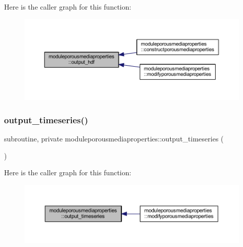 Here is the caller graph for this function\+:\nopagebreak
\begin{figure}[H]
\begin{center}
\leavevmode
\includegraphics[width=350pt]{namespacemoduleporousmediaproperties_afc8549b6ebf2207ac8a080ad892a6cd3_icgraph}
\end{center}
\end{figure}
\mbox{\label{namespacemoduleporousmediaproperties_a23e72e1a1d3d2dc5b268bbc65dbeebed}} 
\subsubsection{\texorpdfstring{output\+\_\+timeseries()}{output\_timeseries()}}
{\footnotesize\ttfamily subroutine, private moduleporousmediaproperties\+::output\+\_\+timeseries (\begin{DoxyParamCaption}{ }\end{DoxyParamCaption})\hspace{0.3cm}{\ttfamily [private]}}

Here is the caller graph for this function\+:\nopagebreak
\begin{figure}[H]
\begin{center}
\leavevmode
\includegraphics[width=350pt]{namespacemoduleporousmediaproperties_a23e72e1a1d3d2dc5b268bbc65dbeebed_icgraph}
\end{center}
\end{figure}
\mbox{\label{namespacemoduleporousmediaproperties_a8875ae5fa2c63a9d71875b7fd07addfb}} 
